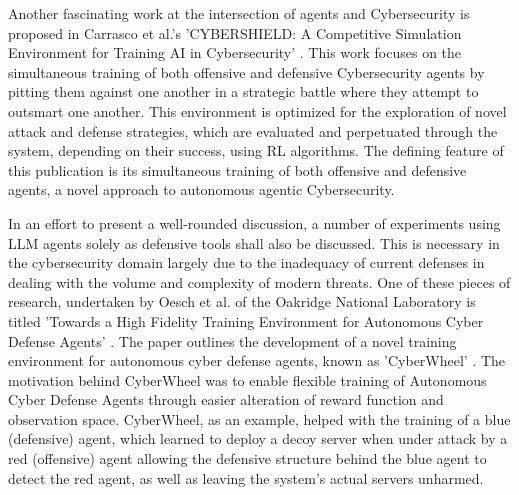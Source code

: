 \documentclass[a4paper,9pt]{scrartcl}
\begin{document}
Another fascinating work at the intersection of agents and Cybersecurity is proposed in 
Carrasco et al.'s 'CYBERSHIELD: A Competitive Simulation Environment for Training AI in 
Cybersecurity' \cite{carrascoCYBERSHIELDCompetitiveSimulation2024}. This work focuses on 
the simultaneous training of both offensive and defensive Cybersecurity agents by pitting 
them against one another in a strategic battle where they attempt to outsmart one another. 
This environment is optimized for the exploration of novel attack and defense strategies, 
which are evaluated and perpetuated through the system, depending on their success, using RL 
algorithms. The defining feature of this publication is its simultaneous training of both 
offensive and defensive agents, a novel approach to autonomous agentic Cybersecurity. 


In an effort to present a well-rounded discussion, a number of experiments using LLM agents solely as 
defensive tools shall also be discussed. This is necessary in the cybersecurity domain 
largely due to the inadequacy of current defenses in dealing with the volume and 
complexity of modern threats. One of these pieces of research, undertaken by Oesch et al. 
of the Oakridge National Laboratory is titled 'Towards a High Fidelity Training Environment for 
Autonomous Cyber Defense Agents' \cite{oeschHighFidelityTraining2024}. The paper outlines 
the development of a novel training environment for autonomous cyber defense agents, known 
as 'CyberWheel' \cite{oeschHighFidelityTraining2024}. The motivation behind CyberWheel was to 
enable flexible training of  Autonomous Cyber Defense Agents through easier alteration of reward 
function and observation space. CyberWheel, as an example, helped with the training of a blue 
(defensive) agent, which learned to deploy a decoy server when under attack by a red 
(offensive) agent \cite{oeschHighFidelityTraining2024} allowing the defensive structure behind the blue 
agent to detect the red agent, as well as leaving the system's actual servers unharmed.
\end{document}
